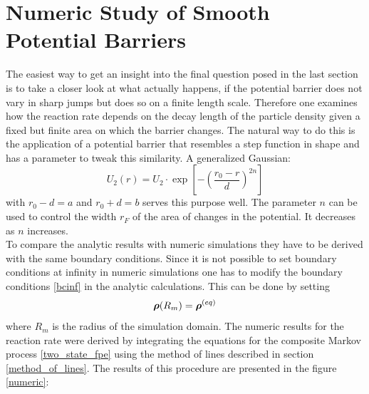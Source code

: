 \newpage
\section{Numeric Study of Smooth Potential Barriers}

The easiest way to get an insight into the final question posed in the last section is to take a closer look at what actually happens, if the potential barrier does not vary in sharp jumps but does so on a finite length scale.
Therefore one examines how the reaction rate depends on the decay length of the particle density given a fixed but finite area on which the barrier changes. The natural way to do this is the application of a potential barrier that resembles a step function in shape and has a parameter to tweak this similarity. A generalized Gaussian:
\begin{equation}
    U_2(r) = U_2 \cdot \exp \left[ - \left( \frac{r_0 - r}{d} \right)^{2n} \right]
    \label{generalized_gaussian}
\end{equation}
with $r_0-d=a$ and $r_0+d=b$ serves this purpose well. The parameter $n$ can be used to control the width $r_F$ of the area of changes in the potential. It decreases as $n$ increases. \\
To compare the analytic results with numeric simulations they have to be derived with the same boundary conditions. Since it is not possible to set boundary conditions at infinity in numeric simulations one has to modify the boundary conditions \eqref{bcinf} in the analytic calculations. This can be done by setting 
\begin{equation}
    \boldsymbol{\mathbf{\rho}}(R_m) = \boldsymbol{\mathbf{\rho}}^{(eq)}
    \label{BC_for_numerics}
\end{equation}
where $R_m$ is the radius of the simulation domain. The numeric results for the reaction rate were derived by integrating the equations for the composite Markov process \eqref{two_state_fpe} using the method of lines described in section \ref{method_of_lines}. The results of this procedure are presented in the figure \ref{numeric}: \vspace{-0.5 cm}\\

